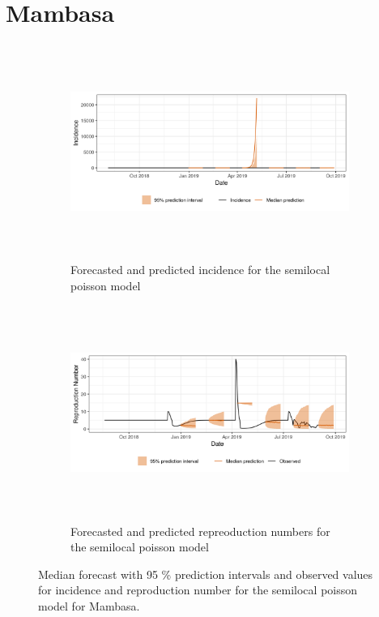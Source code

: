  \section{ Mambasa }\begin{figure}[H]\begin{subfigure}{\textwidth}  \centering  \includegraphics[width=0.9\linewidth, height=7cm]{../output/Mambasa_predictions.png}  \caption{Forecasted and predicted incidence for the semilocal poisson model}\end{subfigure}

\begin{subfigure}{\textwidth}  \centering  \includegraphics[width=0.9\linewidth, height=7cm]{../output/Mambasa_Rs.png}  \caption{Forecasted and predicted repreoduction numbers for the semilocal poisson model}\end{subfigure}  \caption{Median forecast with 95 \% prediction intervals and observed values for incidence and reproduction number for the semilocal poisson model for Mambasa.}\end{figure}

